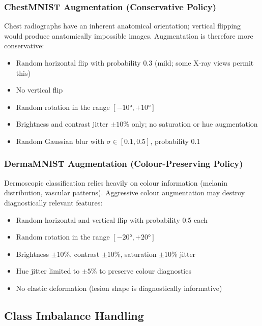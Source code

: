 \subsubsection{ChestMNIST Augmentation (Conservative Policy)}

Chest radiographs have an inherent anatomical orientation; vertical flipping would produce anatomically impossible images. Augmentation is therefore more conservative:

\begin{itemize}
    \item Random horizontal flip with probability 0.3 (mild; some X-ray views permit this)
    \item No vertical flip
    \item Random rotation in the range $[-10°, +10°]$
    \item Brightness and contrast jitter $\pm 10\%$ only; no saturation or hue augmentation
    \item Random Gaussian blur with $\sigma \in [0.1, 0.5]$, probability 0.1
\end{itemize}

\subsubsection{DermaMNIST Augmentation (Colour-Preserving Policy)}

Dermoscopic classification relies heavily on colour information (melanin distribution, vascular patterns). Aggressive colour augmentation may destroy diagnostically relevant features:

\begin{itemize}
    \item Random horizontal and vertical flip with probability 0.5 each
    \item Random rotation in the range $[-20°, +20°]$
    \item Brightness $\pm 10\%$, contrast $\pm 10\%$, saturation $\pm 10\%$ jitter
    \item Hue jitter limited to $\pm 5\%$ to preserve colour diagnostics
    \item No elastic deformation (lesion shape is diagnostically informative)
\end{itemize}

\subsection{Class Imbalance Handling}


